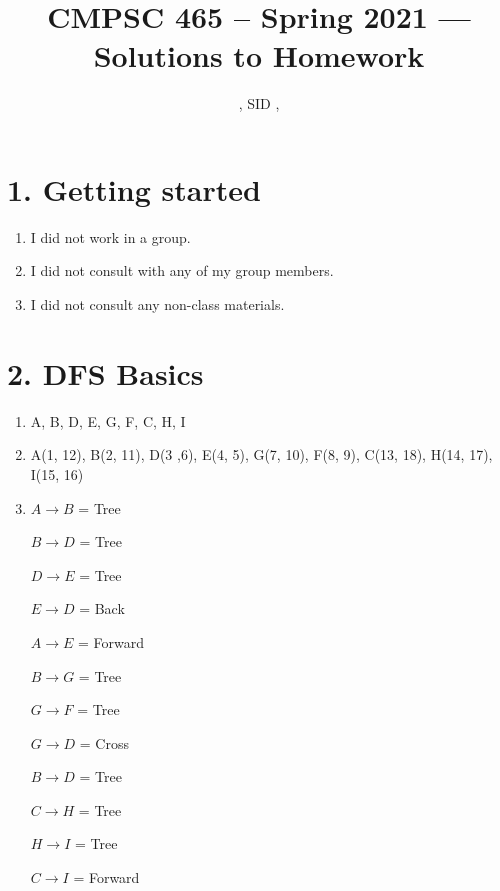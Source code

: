 \documentclass[11pt]{article}
\title{CMPSC 465 -- Spring 2021 --- Solutions to Homework \Homework}
\author{\Name, SID \SID, \texttt{\Login}}
\newenvironment{qparts}{\begin{enumerate}[{(}a{)}]}{\end{enumerate}}
\begin{document}
\maketitle


\section*{1. Getting started}
\begin{qparts}
\item
I did not work in a group.
\item
I did not consult with any of my group members.
\item
I did not consult any non-class materials.
\end{qparts}



\newpage
\section*{2. DFS Basics}
\begin{qparts}
\item
A, B, D, E, G, F, C, H, I

\item
A(1, 12), B(2, 11), D(3 ,6), E(4, 5), G(7, 10), F(8, 9), C(13, 18), H(14, 17), I(15, 16)

\item
$A \rightarrow B$ = Tree

$B \rightarrow D$ = Tree 

$D \rightarrow E$ = Tree 

$E \rightarrow D$ = Back

$A \rightarrow E$ = Forward

$B \rightarrow G$ = Tree 

$G \rightarrow F$ = Tree 

$G \rightarrow D$ = Cross 

$B \rightarrow D$ = Tree 

$C \rightarrow H$ = Tree 

$H \rightarrow I$ = Tree 

$C \rightarrow I$ = Forward

\end{qparts}


\newpage
\end{document}
